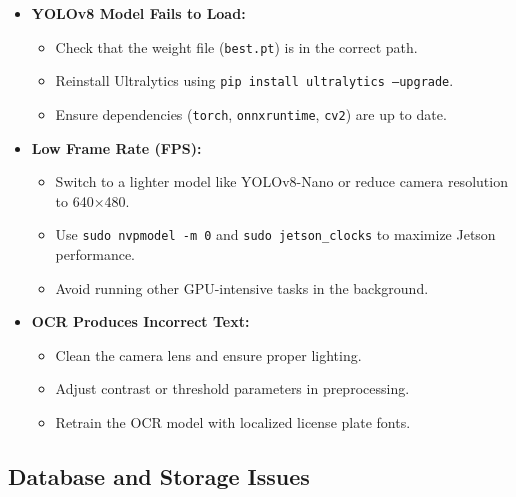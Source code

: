 \begin{itemize}
	\item \textbf{YOLOv8 Model Fails to Load:}  
	\begin{itemize}
		\item Check that the weight file (\texttt{best.pt}) is in the correct path.  
		\item Reinstall Ultralytics using \texttt{pip install ultralytics --upgrade}.  
		\item Ensure dependencies (\texttt{torch}, \texttt{onnxruntime}, \texttt{cv2}) are up to date.
	\end{itemize}
	
	\item \textbf{Low Frame Rate (FPS):}  
	\begin{itemize}
		\item Switch to a lighter model like YOLOv8-Nano or reduce camera resolution to 640×480.  
		\item Use \texttt{sudo nvpmodel -m 0} and \texttt{sudo jetson\_clocks} to maximize Jetson performance.  
		\item Avoid running other GPU-intensive tasks in the background.
	\end{itemize}
	
	\item \textbf{OCR Produces Incorrect Text:}  
	\begin{itemize}
		\item Clean the camera lens and ensure proper lighting.  
		\item Adjust contrast or threshold parameters in preprocessing.  
		\item Retrain the OCR model with localized license plate fonts.
	\end{itemize}
\end{itemize}
\subsection{Database and Storage Issues}

